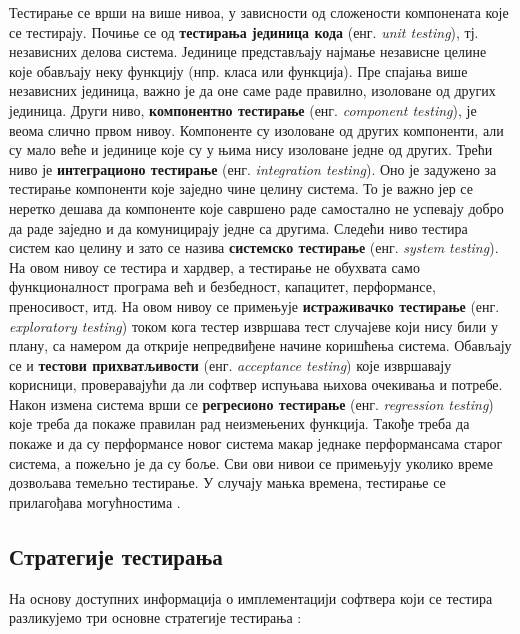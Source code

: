 \documentclass[12pt,oneside]{memoir}
\begin{document}
\par Тестирање се врши на више нивоа, у зависности од сложености компонената које се тестирају. Почиње се од \textbf{тестирања јединица кода} (енг. \textit{unit testing}), тј. независних делова система. Јединице представљају најмање независне целине које обављају неку функцију (нпр. класа или функција). Пре спајања више независних јединица, важно је да оне саме раде правилно, изоловане од других јединица. Други ниво, \textbf{компонентно тестирање} (енг. \textit{component testing}), је веома слично првом нивоу. Компоненте су изоловане од других компоненти, али су мало веће и јединице које су у њима нису изоловане једне од других. Трећи ниво је \textbf{интеграционо тестирање} (енг. \textit{integration testing}). Оно је задужено за тестирање компоненти које заједно чине целину система. То је важно јер се неретко дешава да компоненте које савршено раде самостално не успевају добро да раде заједно и да комуницирају једне са другима. Следећи ниво тестира систем као целину и зато се назива \textbf{системско тестирање} (енг. \textit{system testing}). На овом нивоу се тестира и хардвер, а тестирање не обухвата само функционалност програма већ и безбедност, капацитет, перформансе, преносивост, итд. На овом нивоу се примењује \textbf{истраживачко тестирање} (енг. \textit{exploratory testing}) током кога тестер извршава тест случајеве који нису били у плану, са намером да открије непредвиђене начине коришћења система. Обављају се и \textbf{тестови прихватљивости} (енг. \textit{acceptance testing}) које извршавају корисници, проверавајући да ли софтвер испуњава њихова очекивања и потребе. Након измена система врши се \textbf{регресионо тестирање} (енг. \textit{regression testing}) које треба да покаже правилан рад неизмењених  функција. Такође треба да покаже и да су перформансе новог система макар једнаке перформансама старог система, а пожељно је да су боље. Сви ови нивои се примењују уколико време дозвољава темељно тестирање. У случају мањка времена, тестирање се прилагођава могућностима \cite{guideTestDesign, testMilena}.

\subsection{Стратегије тестирања}
\label{subsec:stratTest}

На основу доступних информација о имплементацији софтвера који се тестира разликујемо три основне стратегије тестирања \cite{fuzzingBrute, fuzzing, testMilena}: 
\end{document}
